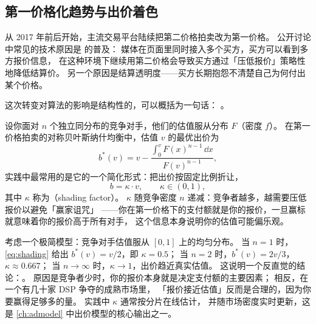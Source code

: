 \subsection{第一价格化趋势与出价着色}

从 2017 年前后开始，主流交易平台陆续把第二价格拍卖改为第一价格。
公开讨论中常见的技术原因是 的普及：
媒体在页面里同时接入多个买方，买方可以看到多方报价信息，
在这种环境下继续用第二价格会导致买方通过「压低报价」策略性地降低结算价。
另一个原因是结算透明度——买方长期抱怨不清楚自己为何付出某个价格。

这次转变对算法的影响是结构性的，可以概括为一句话：
。

\begin{formulacard}[第一价格下的最优着色因子]
设你面对 $n$ 个独立同分布的竞争对手，他们的估值服从分布 $F$（密度 $f$）。
在第一价格拍卖的对称贝叶斯纳什均衡中，估值 $v$ 的最优出价为
\begin{equation}
b^*(v) = v - \frac{\int_{0}^{v} F(x)^{n-1} \,\dd x}{F(v)^{n-1}} ,
\label{eq:shading}
\end{equation}
实践中最常用的是它的一个简化形式：把出价按固定比例折让，
\begin{equation}
b = \kappa \cdot v , \qquad \kappa \in (0, 1) ,
\label{eq:shading-factor}
\end{equation}
其中 $\kappa$ 称为（shading factor）。
$\kappa$ 随竞争密度 $n$ 递减：竞争者越多，越需要压低报价以避免「赢家诅咒」
——你在第一价格下的支付额就是你的报价，一旦赢标就意味着你的报价高于所有对手，
这个信息本身说明你的估值可能偏乐观。
\end{formulacard}

\begin{example}[着色因子的量级直觉]
考虑一个极简模型：竞争对手估值服从 $[0, 1]$ 上的均匀分布。
当 $n = 1$ 时，\cref{eq:shading} 给出 $b^*(v) = v/2$，即 $\kappa = 0.5$；
当 $n = 2$ 时，$b^*(v) = 2v/3$，$\kappa \approx 0.667$；
当 $n \to \infty$ 时，$\kappa \to 1$，出价趋近真实估值。
这说明一个反直觉的结论：。
原因是竞争者少时，你的报价本身就是决定支付额的主要因素；
相反，在一个有几十家 DSP 争夺的成熟市场里，
「报价接近估值」反而是合理的，因为你要赢得足够多的量。
实践中 $\kappa$ 通常按分片在线估计，
并随市场密度实时更新，这是 \cref{ch:admodel} 中出价模型的核心输出之一。
\end{example}

